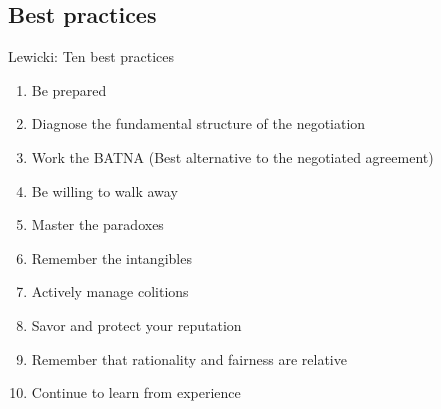 \subsection{Best practices}

Lewicki: Ten best practices

\begin{enumerate}
    \item Be prepared
    \item Diagnose the fundamental structure of the negotiation
    \item Work the BATNA (Best alternative to the negotiated agreement)
    \item Be willing to walk away
    \item Master the paradoxes
    \item Remember the intangibles
    \item Actively manage colitions
    \item Savor and protect your reputation
    \item Remember that rationality and fairness are relative
    \item Continue to learn from experience
\end{enumerate}